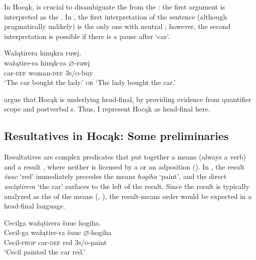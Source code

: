 \documentclass[output=paper]{LSP/langsci}
\begin{document}
In Hocąk,  is crucial to disambiguate the  from the : the first argument is interpreted as the . In , the first interpretation of the sentence (although pragmatically unlikely) is the only one with neutral ; however, the second interpretation is  possible if there is a pause after `car'.

\begin{exe}
\ex\label{ex:rosen:6}
 \glll Wažątirera hinųkra ruwį.\\
wažątire-ra hinųk-ra {$\varnothing$}-ruwį\\
car-\textsc{def} woman-\textsc{def} \textsc{3s/o}-buy\\
\glt `The car bought the lady.' \textsc{or} `The lady bought the car.'

\end{exe}
 
\citet{JohnsonRosen2014} argue that Hocąk is underlying head-final, by providing evidence from quantifier scope and postverbal s. Thus, I represent Hocąk as head-final here.

\subsection{Resultatives in Hocąk: Some preliminaries} 

Resultatives are complex predicates that put together a means  (always a verb) and a result , where neither is licensed by a  or an adposition (\citealt{Williams2008}). In , the result \textit{šuuc} `red' immediately precedes the means \textit{hogiha} `paint', and the direct  \textit{wažątirera} `the car' surfaces to the left of the result. Since the result is typically analyzed as the  of the means (\citealt{Li1999}, \citealt{Williams2008}), the result-means order would be expected in a head-final language.

\begin{exe}

\ex \label{ex:rosen:7}\glll Cecilga wažątirera šuuc hogiha. \\
Cecil-ga  wažątire-ra šuuc {$\varnothing$}-hogiha \\
Cecil-\textsc{prop} car-\textsc{def} red \textsc{3s/o}-paint\\
\glt `Cecil painted the car red.'

\end{exe}
\end{document}
